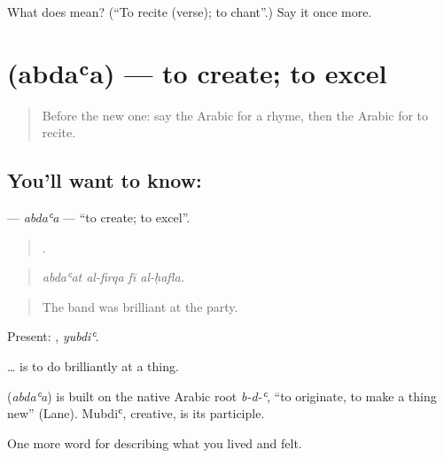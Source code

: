 \begin{tcolorbox}[breakable,colback=teal!4,colframe=teal!35!black,title={Before you move on}]
What does  mean? (\textquotedblleft{}To recite (verse); to chant\textquotedblright{}.) Say it once more.
\end{tcolorbox}
\section[\texorpdfstring{\ar{أبدع} (abdaʿa)}{أبدع (abdaʿa)}]{ (abdaʿa) — to create; to excel}

\label{lesson:AR-C545-abdaa}



\begin{quote}
Before the new one: say the Arabic for a rhyme, then the Arabic for to recite.
\end{quote}

\subsection*{You'll want to know: }
\textbf{} — \emph{abdaʿa} — \textquotedblleft{}to create; to excel\textquotedblright{}.

\begin{quote}
   .
\end{quote}

\begin{quote}
\emph{abdaʿat al-firqa fī al-ḥafla.}
\end{quote}

\begin{quote}
The band was brilliant at the party.
\end{quote}

Present: , \emph{yubdiʿ}.

  … is to do brilliantly at a thing.

\begin{cousinweb}
\textbf{} (\emph{abdaʿa}) is built on the native Arabic root \emph{b-d-ʿ}, \textquotedblleft{}to originate, to make a thing new\textquotedblright{} (Lane). Mubdiʿ, creative, is its participle.
\end{cousinweb}

\begin{grammarlens}[title={What you've built}]
One more word for describing what you lived and felt.
\end{grammarlens}

